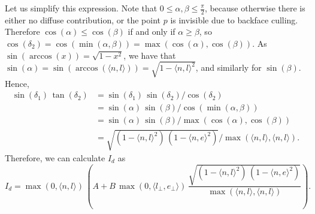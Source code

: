 \documentclass{article}
\theoremstyle{definition}
\theoremstyle{remark}
\begin{document}
Let us simplify this expression.
Note that $0 \leq \alpha, \beta \leq \frac{\pi}{2}$, because otherwise there is either no diffuse contribution, or the point $p$ is invisible due to backface culling.
Therefore $\cos(\alpha) \leq \cos(\beta)$ if and only if $\alpha \geq \beta$, so $\cos(\delta_2) = \cos(\min(\alpha, \beta)) = \max(\cos(\alpha), \cos(\beta))$.
As $\sin(\arccos(x)) = \sqrt{1 - x^2}$, we have that $\sin(\alpha) = \sin(\arccos(\langle n, l \rangle)) = \sqrt{1 - \langle n, l \rangle^2}$, and similarly for $\sin(\beta)$.
Hence,
\begin{align*}
\sin(\delta_1) \, \tan(\delta_2)
 & = \sin(\delta_1) \, \sin(\delta_2) / \cos(\delta_2) \\
 & = \sin(\alpha) \, \sin(\beta) / \cos(\min(\alpha, \beta)) \\
 & = \sin(\alpha) \, \sin(\beta) / \max(\cos(\alpha), \cos(\beta)) \\
 & = \sqrt{(1 - \langle n, l \rangle^2) \, (1 - \langle n, e \rangle^2)} / \max(\langle n, l \rangle, \langle n, l \rangle).
\end{align*}
Therefore, we can calculate $I_d$ as
\begin{equation}
I_d = \max(0, \langle n, l \rangle) \, \left( A + B \, \max(0, \langle l_\perp, e_\perp \rangle) \, \frac{\sqrt{(1 - \langle n, l \rangle^2) \, (1 - \langle n, e \rangle^2)}}{\max(\langle n, l \rangle, \langle n, l \rangle)} \right).
\end{equation}



\end{document}
